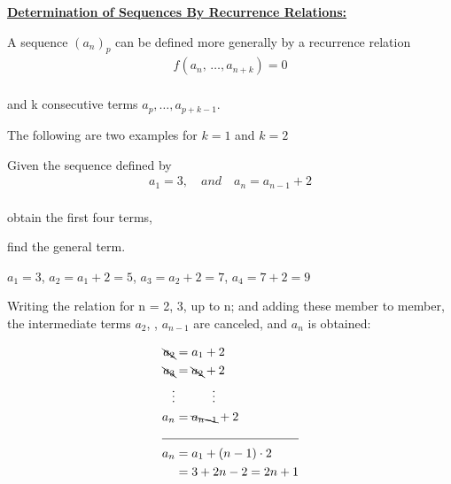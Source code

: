 \documentclass[11pt]{amsbook}
\begin{document}

\par
\underline{\textbf{Determination of Sequences By Recurrence Relations:}}\\

\par
A sequence $(a_{n})_{p}$ can be defined more generally by a recurrence relation\\

\begin{align*}
	f(a_{n},\, \dotso , a_{n+k}) = 0\\
\end{align*}

\noindent and k consecutive terms $a_{p} , \dotso  , a_{p+k-1}$.\\

\par
The following are two examples for $k = 1$ and $k = 2$\\


\begin{exmp} 
	Given the sequence defined by\\
	\begin{align*}
		a_{1} = 3, \quad and\quad a_{n} = a_{n-1} + 2\\
	\end{align*}
	\begin{hEnumerateAlpha}
		\item obtain the first four terms,\\
		\item find the general term.\\
	\end{hEnumerateAlpha}
	\begin{hSolution}
		\begin{hEnumerateAlpha}
			\item $a_1 = 3$, $a_2 = a_1+2 = 5$, $a_3 = a_2 + 2 =7$, $a_4 = 7 + 2 = 9$ \\
			\item Writing the relation for n = 2, 3, \dotso up to n; and adding these member to member, the intermediate terms $a_2$, \dotso , $a_{n-1}$ are canceled, and $a_n$  is obtained:\\
		\end{hEnumerateAlpha}
		\begin{align*}
			\bcancel{ a_{2}} &= a_1 + 2\\
			\bcancel{ a_{3}} &= \bcancel{ a_{2}} + 2\\
			\vdots &\qquad \quad \vdots \\
			a_{n} &= \bcancel{ a_{n-1}} + 2\\
			\cline{1-2}
			a_n &= a_1 + (n-1)\cdot 2\\
			&= 3 + 2n - 2 = 2n+1
		\end{align*}
	\end{hSolution}
\end{exmp}
\end{document}
